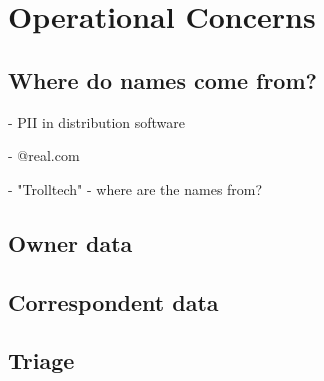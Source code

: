 \chapter{Operational Concerns}
\section{Where do names come from?}
 - PII in distribution software

   - @real.com

   - "Trolltech" - where are the names from?
\section{Owner data}
\section{Correspondent data}
\section{Triage}
